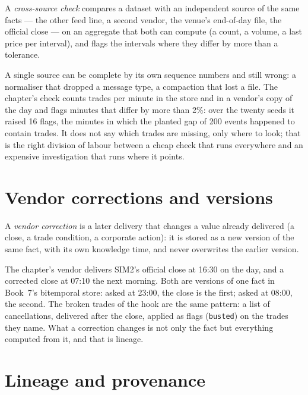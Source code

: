 \begin{definition}\label{def:pl:data-quality-and-lineage:cross}
A \emph{cross-source check} compares a dataset with an independent source of the same facts --- the other
feed line, a second vendor, the venue's end-of-day file, the official close --- on an aggregate that both can compute (a count, a
volume, a last price per interval), and flags the intervals where they differ by more than a tolerance.
\end{definition}

A single source can be complete by its own sequence numbers and still wrong: a normaliser that dropped a message type, a
compaction that lost a file. The chapter's check counts trades per minute in the store and in a vendor's copy of the day and flags
minutes that differ by more than 2\%: over the twenty seeds it raised 16 flags, the minutes in which the planted gap of 200 events
happened to contain trades. It does not say which trades are missing, only where to look; that is the right division of labour
between a cheap check that runs everywhere and an expensive investigation that runs where it points.

\section{Vendor corrections and versions}

\begin{definition}\label{def:pl:data-quality-and-lineage:correction}
A \emph{vendor correction} is a later delivery that changes a value already delivered (a close, a trade
condition, a corporate action): it is stored as a new version of the same fact, with its own knowledge time, and never overwrites
the earlier version.
\end{definition}

The chapter's vendor delivers SIM2's official close at 16:30 on the day, and a corrected close at 07:10 the next morning. Both are
versions of one fact in Book~7's bitemporal store: asked at 23:00, the close is the first; asked at 08:00, the second. The broken
trades of the hook are the same pattern: a list of cancellations, delivered after the close, applied as flags (\texttt{busted}) on
the trades they name. What a correction changes is not only the fact but everything computed from it, and that is lineage.

\section{Lineage and provenance}


